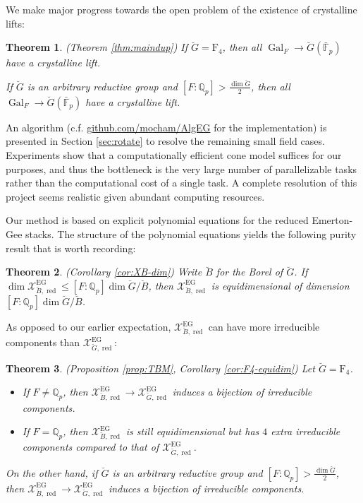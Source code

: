 \documentclass[11pt]{amsart}
\newcommand{\MINOREDITED}[1]{#1}
\newtheorem{thm}{Theorem}[section]
\theoremstyle{definition}
\newcommand{\Q}{\mathbb{Q}}
\newcommand{\bFp}{\bar{\mathbb{F}}_p}
\newcommand{\cX}{\mathcal{X}}
\newcommand{\bG}{\breve{G}}
\newcommand{\bB}{\breve{B}}
\DeclareMathOperator{\EG}{EG}
\DeclareMathOperator{\red}{red}
\DeclareMathOperator{\Gal}{Gal}
\begin{document}
We make major progress
towards the open problem of
the existence of crystalline lifts:

\begin{thm} (Theorem \ref{thm:maindup})
\label{thm:main}
If $\bG=\mathrm{F}_4$, then all $\Gal_F\to \bG(\bFp)$
have a crystalline lift.

If $\bG$ is an arbitrary reductive group
and $[F:\Q_p]>\frac{\dim \bG}{2}$, then all $\Gal_F\to \bG(\bFp)$
have a crystalline lift.
\end{thm}

An algorithm
(c.f. \url{github.com/mocham/AlgEG} for the implementation)
is presented
in Section \ref{sec:rotate}
to resolve the remaining small field
cases.
Experiments show that a computationally efficient
cone model suffices for our purposes,
and thus the bottleneck is the
very large number of parallelizable tasks
rather than the computational cost of a single task.
A complete resolution of this project seems
realistic given abundant computing resources.

Our method is based on explicit polynomial equations
for the reduced Emerton-Gee stacks.
The structure of the polynomial equations yields the following
purity result that is worth recording:

\begin{thm} (Corollary \ref{cor:XB-dim})
\label{thm:purity}
Write $\bB$ for the Borel of $\bG$.
If $\dim \cX_{\bB,\red}^{\EG}\le [F:\Q_p]\dim \bG/\bB$,
then
$\cX_{\bB,\red}^{\EG}$
is equidimensional of dimension $[F:\Q_p]\dim \bG/\bB$.
\end{thm}

As opposed to our earlier expectation,
$\cX_{\bB,\red}^{\EG}$
can have 
\MINOREDITED{more irreducible components than}
$\cX_{\bG,\red}^{\EG}$:

\begin{thm} (Proposition \ref{prop:TBM}, Corollary \ref{cor:F4-equidim})
\label{thm:comp}
Let $\bG=\mathrm{F}_4$.
\begin{itemize}
\item 
If $F\neq \Q_p$, then
$\cX_{\bB,\red}^{\EG}\to \cX_{\bG,\red}^{\EG}$
induces a bijection of irreducible components.


\item
If $F= \Q_p$, then
$\cX_{\bB,\red}^{\EG}$
is still equidimensional but
has $4$ extra irreducible components
compared to that of
$\cX_{\bG,\red}^{\EG}$.
\end{itemize}


On the other hand,
if $\bG$ is an arbitrary reductive group
and $[F:\Q_p]>\frac{\dim \bG}{2}$, then 
$\cX_{\bB,\red}^{\EG}\to \cX_{\bG,\red}^{\EG}$
induces a bijection of irreducible components.
\end{thm}
\end{document}
